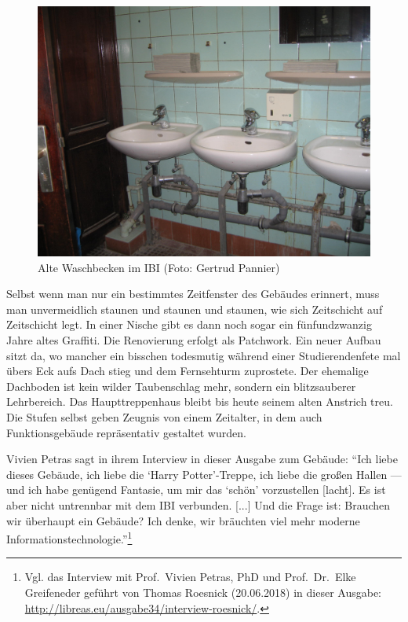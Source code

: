 \documentclass[a4paper,
fontsize=11pt,
oneside,
numbers=noperiodatend,
parskip=half-,
bibliography=totoc,
final
]{scrartcl}
\begin{document}
\begin{figure}
\centering
\includegraphics{img/waschen.jpg}
\caption{Alte Waschbecken im IBI (Foto: Gertrud Pannier)}
\end{figure}

Selbst wenn man nur ein bestimmtes Zeitfenster des Gebäudes erinnert,
muss man unvermeidlich staunen und staunen und staunen, wie sich
Zeitschicht auf Zeitschicht legt. In einer Nische gibt es dann noch
sogar ein fünfundzwanzig Jahre altes Graffiti. Die Renovierung erfolgt
als Patchwork. Ein neuer Aufbau sitzt da, wo mancher ein bisschen
todesmutig während einer Studierendenfete mal übers Eck aufs Dach stieg
und dem Fernsehturm zuprostete. Der ehemalige Dachboden ist kein wilder
Taubenschlag mehr, sondern ein blitzsauberer Lehrbereich. Das
Haupttreppenhaus bleibt bis heute seinem alten Anstrich treu. Die Stufen
selbst geben Zeugnis von einem Zeitalter, in dem auch Funktionsgebäude
repräsentativ gestaltet wurden.

Vivien Petras sagt in ihrem Interview in dieser Ausgabe zum Gebäude:
\enquote{Ich liebe dieses Gebäude, ich liebe die \enquote{Harry
Potter}-Treppe, ich liebe die großen Hallen --- und ich habe genügend
Fantasie, um mir das \enquote{schön} vorzustellen {[}lacht{]}. Es ist
aber nicht untrennbar mit dem IBI verbunden. {[}...{]} Und die Frage
ist: Brauchen wir überhaupt ein {Gebäude}? Ich denke, wir bräuchten viel
mehr moderne Informationstechnologie.}\footnote{Vgl. das Interview mit
  Prof.~Vivien Petras, PhD und Prof.~Dr.~Elke Greifeneder 
  geführt von Thomas Roesnick (20.06.2018) in dieser Ausgabe: \href{http://libreas.eu/ausgabe34/interview-roesnick/}{http://libreas.eu/ausgabe34/interview-roesnick/}.}
\end{document}
